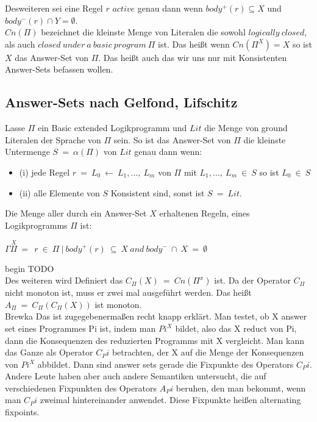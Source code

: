 Desweiteren sei eine Regel $r$ $active$ genau dann wenn
$body^+(r) \subseteq X$ und $body^-(r) \cap Y = \emptyset$.\\

$Cn(\Pi)$ bezeichnet die kleinste Menge von Literalen die sowohl $logically~closed$,
als auch $closed~under~a~basic~program~\Pi$ ist. Das heißt wenn $Cn(\Pi^X)=X$
so ist $X$ das Answer-Set von $\Pi$. Das heißt auch das wir uns nur
mit Konsistenten Answer-Sets befassen wollen.\\

\subsection{Answer-Sets nach Gelfond, Lifschitz}

Lasse $\Pi$ ein Basic extended Logikprogramm und $Lit$ die Menge von
ground Literalen der Sprache von $\Pi$ sein\cite{GelfondLifschitz1991}. So ist das Answer-Set
von $\Pi$ die kleinste Untermenge $S~=~\alpha(\Pi)$ von $Lit$ genau dann wenn:

\begin{itemize}
	\item (i) jede Regel $r~=~L_0~\leftarrow~L_1 ,...,~L_m$ von $\Pi$ mit $L_1 ,...,~L_m~\in~S$ so ist $L_0~\in~S$
	\item (ii) alle Elemente von $S$ Konsistent sind, sonst ist $S~=~Lit$.
\end{itemize}

Die Menge aller durch ein Answer-Set $X$ erhaltenen Regeln,
eines Logikprogramms $\Pi$ ist:

\begin{center}
  $\Gamma\stackrel{X}{\Pi}~=~{~r~\in~\Pi~|~body^+(r)~\subseteq~X~and~body^-~\cap~X~=~\emptyset~}~$\\
\end{center}


begin TODO \\

Des weiteren wird Definiert das $C_\Pi(X)~=~Cn(\Pi^x)$ ist.
Da der Operator $C_\Pi$ nicht monoton ist, muss er zwei mal ausgeführt werden.
Das heißt $A_\Pi~=~C_\Pi(C_\Pi(X))$ ist monoton.\\

Brewka
Das ist zugegebenermaßen recht knapp erklärt. Man testet, ob X answer 
set eines Programmes Pi ist, indem man $Pi^X$ bildet, also das X reduct 
von Pi, dann die Konsequenzen des reduzierten Programms mit X 
vergleicht. Man kann das Ganze als Operator $C_Pi$ betrachten, der X auf 
die Menge der Konsequenzen von $Pi^X$ abbildet. Dann sind answer sets 
gerade die Fixpunkte des Operators $C_Pi$. Andere Leute haben aber auch 
andere Semantiken untersucht, die auf verschiedenen Fixpunkten des 
Operators $A_Pi$ beruhen, den man bekommt, wenn man $C_Pi$ zweimal 
hintereinander anwendet. Diese Fixpunkte heißen alternating fixpoints.
\\

